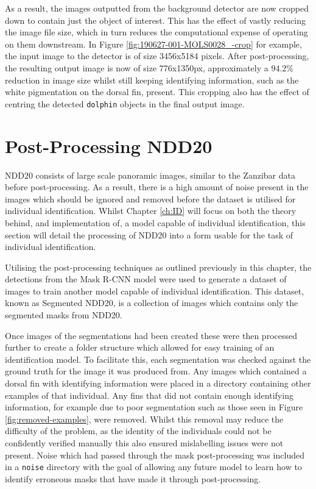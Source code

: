 As a result, the images outputted from the background detector are now cropped down to contain just the object of interest. This has the effect of vastly reducing the image file size, which in turn reduces the computational expense of operating on them downstream. In Figure \ref{fig:190627-001-MOLS0028_-crop} for example, the input image to the detector is of size 3456x5184 pixels. After post-processing, the resulting output image is now of size 776x1350px, approximately a 94.2\% reduction in image size whilst still keeping identifying information,  such as the white pigmentation on the dorsal fin, present. This cropping also has the effect of centring the detected \texttt{dolphin} objects in the final output image. 

\section{Post-Processing NDD20}\label{ch:postProcessing,sec:postProcessingNDD20}

NDD20 consists of large scale panoramic images, similar to the Zanzibar data before post-processing. As a result, there is a high amount of noise present in the images which should be ignored and removed before the dataset is utilised for individual identification. Whilst Chapter \ref{ch:ID} will focus on both the theory behind, and implementation of, a model capable of individual identification, this section will detail the processing of NDD20 into a form usable for the task of individual identification.

Utilising the post-processing techniques as outlined previously in this chapter, the detections from the Mask R-CNN model were used to generate a dataset of images to train another model capable of individual identification. This dataset, known as Segmented NDD20, is a collection of images which contains only the segmented masks from NDD20. 

Once images of the segmentations had been created these were then processed further to create a folder structure which allowed for easy training of an identification model. To facilitate this, each segmentation was checked against the ground truth for the image it was produced from. Any images which contained a dorsal fin with identifying information were placed in a directory containing other examples of that individual. Any fins that did not contain enough identifying information, for example due to poor segmentation such as those seen in Figure \ref{fig:removed-examples}, were removed. Whilst this removal may reduce the difficulty of the problem, as the identity of the individuals could not be confidently verified manually this also ensured mislabelling issues were not present. Noise which had passed through the mask post-processing was included in a \texttt{noise} directory with the goal of allowing any future model to learn how to identify erroneous masks that have made it through post-processing. 

